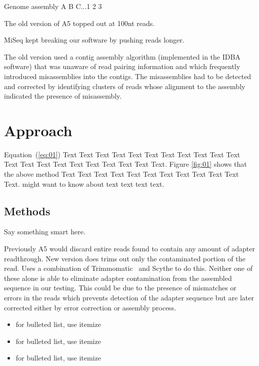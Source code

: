 \documentclass{bioinfo}
\begin{document}
Genome assembly A B C...1 2 3

The old version of A5 topped out at 100nt reads\citep{Tritt12}.

MiSeq kept breaking our software by pushing reads longer.

The old version used a contig assembly algorithm (implemented in the IDBA software) that was unaware of read pairing information and which frequently introduced misassemblies into the contigs.
The misassemblies had to be detected and corrected by identifying clusters of reads whose alignment to the assembly indicated the presence of misassembly.


\section{Approach}

Equation~(\ref{eq:01}) Text Text Text Text Text Text  Text Text Text Text Text Text Text Text Text  Text Text Text Text Text Text. Figure \ref{fig:01} shows that the above method  Text Text Text Text  Text Text Text Text Text Text  Text Text.  \citealp{Boffelli03} might want to know about  text text text text.


\begin{methods}
\section{Methods}

Say something smart here.

Previously A5 would discard entire reads found to contain any amount of adapter readthrough. 
New version does trims out only the contaminated portion of the read.
Uses a combination of Trimmomatic~\citep{Lohse12} and Scythe to do this.
Neither one of these alone is able to eliminate adapter contamination from the assembled sequence in our testing.
This could be due to the presence of mismatches or errors in the reads which prevents detection of the adapter sequence but are later corrected either by error correction or assembly process.

\begin{itemize}
\item for bulleted list, use itemize
\item for bulleted list, use itemize
\item for bulleted list, use itemize
\end{itemize}



\end{methods}
\end{document}
